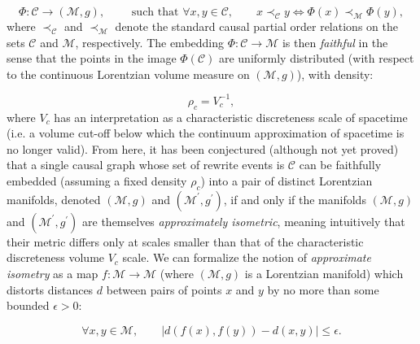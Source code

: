\documentclass{article}
\begin{document}
\begin{equation}
\Phi : \mathcal{C} \to \left( \mathcal{M}, g \right), \qquad \text{ such that } \forall x, y \in \mathcal{C}, \qquad x \prec_{\mathcal{C}} y \Leftrightarrow \Phi \left( x \right) \prec_{\mathcal{M}} \Phi \left( y \right),
\end{equation}
where ${\prec_{\mathcal{C}}}$ and ${\prec_{\mathcal{M}}}$ denote the standard causal partial order relations on the sets ${\mathcal{C}}$ and ${\mathcal{M}}$, respectively. The embedding ${\Phi : \mathcal{C} \to \mathcal{M}}$ is then \textit{faithful} in the sense that the points in the image ${\Phi \left( \mathcal{C} \right)}$ are uniformly distributed (with respect to the continuous Lorentzian volume measure on ${\left( \mathcal{M}, g \right)}$), with density:

\begin{equation}
\rho_c = V_{c}^{-1},
\end{equation}
where ${V_c}$ has an interpretation as a characteristic discreteness scale of spacetime (i.e. a volume cut-off below which the continuum approximation of spacetime is no longer valid). From here, it has been conjectured (although not yet proved) that a single causal graph whose set of rewrite events is ${\mathcal{C}}$ can be faithfully embedded (assuming a fixed density ${\rho_c}$) into a pair of distinct Lorentzian manifolds, denoted ${\left( \mathcal{M}, g \right)}$ and ${\left( \mathcal{M}^{\prime}, g^{\prime} \right)}$, if and only if the manifolds ${\left( \mathcal{M}, g \right)}$ and ${\left( \mathcal{M}^{\prime}, g^{\prime} \right)}$ are themselves \textit{approximately isometric}\cite{bombelli2}, meaning intuitively that their metric differs only at scales smaller than that of the characteristic discreteness volume ${V_c}$ scale. We can formalize the notion of \textit{approximate isometry} as a map ${f : \mathcal{M} \to \mathcal{M}}$ (where ${\left( \mathcal{M}, g \right)}$ is a Lorentzian manifold) which distorts distances $d$ between pairs of points $x$ and $y$ by no more than some bounded ${\epsilon > 0}$:

\begin{equation}
\forall x, y \in \mathcal{M}, \qquad \left\lvert d \left( f \left( x \right), f \left( y \right) \right) - d \left( x, y \right) \right\rvert \leq \epsilon.
\end{equation}
\end{document}
